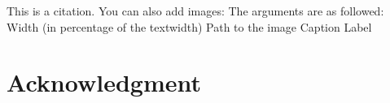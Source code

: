 \markdownRendererInterblockSeparator
{}\lipsum[3]\markdownRendererInterblockSeparator
{}\markdownRendererInterblockSeparator
{}\lipsum[3]\markdownRendererInterblockSeparator
{}\markdownRendererInterblockSeparator
{}\lipsum[3]\markdownRendererInterblockSeparator
{}\markdownRendererInterblockSeparator
{}\lipsum[3]\markdownRendererInterblockSeparator
{}\markdownRendererInterblockSeparator
{}\lipsum[3]\markdownRendererInterblockSeparator
{}\markdownRendererInterblockSeparator
{}This is a citation.\cite{Goodfellow.2016}\markdownRendererInterblockSeparator
{}You can also add images:\markdownRendererInterblockSeparator
{}\markdownRendererInterblockSeparator
{}The arguments are as followed:\markdownRendererInterblockSeparator
{}\markdownRendererOlBeginTight
{}Width (in percentage of the textwidth)\markdownRendererOlItemEnd 
{}Path to the image\markdownRendererOlItemEnd 
{}Caption\markdownRendererOlItemEnd 
{}Label\markdownRendererOlItemEnd 
\markdownRendererOlEndTight \markdownRendererInterblockSeparator
{}\section*{Acknowledgment}\markdownRendererInterblockSeparator
{}\lipsum[1]\relax